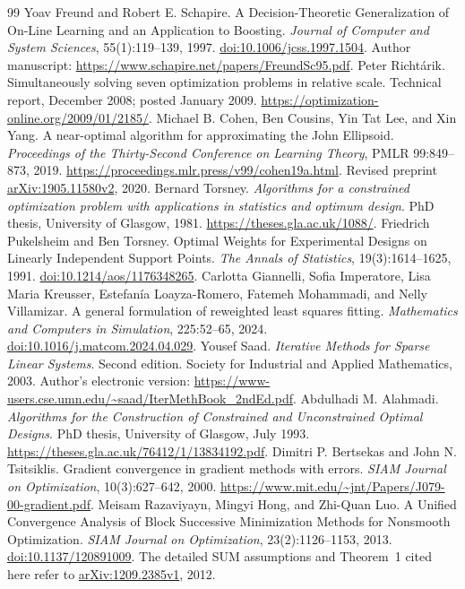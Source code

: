 \begin{thebibliography}{99}
 Yoav Freund and Robert E. Schapire. A Decision-Theoretic Generalization of On-Line Learning and an Application to Boosting. \emph{Journal of Computer and System Sciences}, 55(1):119--139, 1997. \href{https://doi.org/10.1006/jcss.1997.1504}{doi:10.1006/jcss.1997.1504}. Author manuscript: \url{https://www.schapire.net/papers/FreundSc95.pdf}.
 Peter Richt\'arik. Simultaneously solving seven optimization problems in relative scale. Technical report, December 2008; posted January 2009. \url{https://optimization-online.org/2009/01/2185/}.
 Michael B. Cohen, Ben Cousins, Yin Tat Lee, and Xin Yang. A near-optimal algorithm for approximating the John Ellipsoid. \emph{Proceedings of the Thirty-Second Conference on Learning Theory}, PMLR 99:849--873, 2019. \url{https://proceedings.mlr.press/v99/cohen19a.html}. Revised preprint \href{https://arxiv.org/abs/1905.11580v2}{arXiv:1905.11580v2}, 2020.
 Bernard Torsney. \emph{Algorithms for a constrained optimization problem with applications in statistics and optimum design}. PhD thesis, University of Glasgow, 1981. \url{https://theses.gla.ac.uk/1088/}.
 Friedrich Pukelsheim and Ben Torsney. Optimal Weights for Experimental Designs on Linearly Independent Support Points. \emph{The Annals of Statistics}, 19(3):1614--1625, 1991. \href{https://doi.org/10.1214/aos/1176348265}{doi:10.1214/aos/1176348265}.
 Carlotta Giannelli, Sofia Imperatore, Lisa Maria Kreusser, Estefan\'ia Loayza-Romero, Fatemeh Mohammadi, and Nelly Villamizar. A general formulation of reweighted least squares fitting. \emph{Mathematics and Computers in Simulation}, 225:52--65, 2024. \href{https://doi.org/10.1016/j.matcom.2024.04.029}{doi:10.1016/j.matcom.2024.04.029}.
 Yousef Saad. \emph{Iterative Methods for Sparse Linear Systems}. Second edition. Society for Industrial and Applied Mathematics, 2003. Author's electronic version: \url{https://www-users.cse.umn.edu/~saad/IterMethBook_2ndEd.pdf}.
 Abdulhadi M. Alahmadi. \emph{Algorithms for the Construction of Constrained and Unconstrained Optimal Designs}. PhD thesis, University of Glasgow, July 1993. \url{https://theses.gla.ac.uk/76412/1/13834192.pdf}.
 Dimitri P. Bertsekas and John N. Tsitsiklis. Gradient convergence in gradient methods with errors. \emph{SIAM Journal on Optimization}, 10(3):627--642, 2000. \url{https://www.mit.edu/~jnt/Papers/J079-00-gradient.pdf}.
 Meisam Razaviyayn, Mingyi Hong, and Zhi-Quan Luo. A Unified Convergence Analysis of Block Successive Minimization Methods for Nonsmooth Optimization. \emph{SIAM Journal on Optimization}, 23(2):1126--1153, 2013. \href{https://doi.org/10.1137/120891009}{doi:10.1137/120891009}. The detailed SUM assumptions and Theorem~1 cited here refer to \href{https://arxiv.org/abs/1209.2385v1}{arXiv:1209.2385v1}, 2012.

\end{thebibliography}
